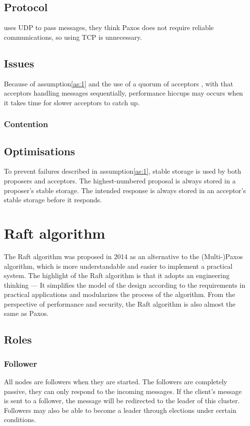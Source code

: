 \documentclass[12pt, a4paper]{article}
\begin{document}
\subsection{Protocol}
\cite{PaxosMadeSwitch-y} uses UDP to pass messages, 
they think Paxos does not require reliable communications, 
so using TCP is unnecessary.
\subsection{Issues}
Because of assumption\ref{as:1} and 
the use of a quorum of acceptors \cite{jalili2014practical}, 
with that acceptors handling messages sequentially,
performance hiccups may occurs when it takes time for slower acceptors 
to catch up.
\subsubsection{Contention}

\subsection{Optimisations}
To prevent failures described in assumption\ref{as:1}, 
stable storage is used by both proposers and acceptors.
The highest-numbered proposal is always stored in a proposer's stable storage.
The intended response is always stored in an acceptor's stable storage
before it responds.

\section{Raft algorithm} \label{sec:raft}
The Raft algorithm was proposed in 2014\cite{conf/usenix/OngaroO14} as an alternative to the (Multi-)Paxos algorithm, which is more
understandable and easier to implement a practical system. The highlight of the Raft algorithm is that it adopts an
engineering thinking --- It simplifies the model of the design according to the requirements in practical applications and
modularizes the process of the algorithm. From the perspective of performance and security, the Raft algorithm is also almost
the same as Paxos.
\subsection{Roles}
  \subsubsection{Follower}
  All nodes are followers when they are started. The followers are completely passive, they can only respond to the incoming
  messages. If the client's message is sent to a follower, the message will be redirected to the leader of this cluster. Followers may
  also be able to become a leader through elections under certain conditions.
\end{document}
